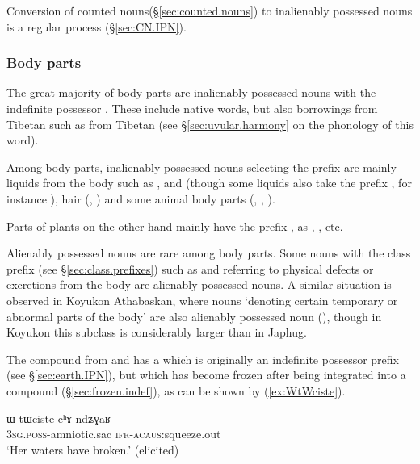 Conversion of counted nouns(§\ref{sec:counted.nouns}) to inalienably possessed nouns is a regular process (§\ref{sec:CN.IPN}).

\subsubsection{Body parts} \label{sec:body.part}
The great majority of body parts are inalienably possessed nouns with the indefinite possessor . These include native words, but also borrowings from Tibetan such as  from Tibetan  (see §\ref{sec:uvular.harmony} on the phonology of this word).

Among body parts, inalienably possessed nouns selecting the prefix  are mainly liquids from the body such as ,  and  (though some liquids also take the prefix , for instance ), hair (, ) and some animal body parts (, , ).

Parts of plants on the other hand mainly have the prefix , as , ,  etc.

Alienably possessed nouns are rare among body parts. Some nouns with the  class prefix (see §\ref{sec:class.prefixes}) such as  and  referring to physical defects or excretions from the body are alienably possessed nouns. A similar situation is observed in Koyukon Athabaskan, where nouns `denoting certain temporary or abnormal parts of the body' are also alienably possessed noun (\citealt[660]{thompson96koyukon}), though in Koyukon this subclass is considerably larger than in Japhug.

The compound  from  and  has a  which is originally an indefinite possessor prefix (see §\ref{sec:earth.IPN}), but which has become frozen after being integrated into a compound (§\ref{sec:frozen.indef}), as can be shown by (\ref{ex:WtWciste}). 

\begin{exe}
\ex \label{ex:WtWciste}
\gll ɯ-tɯciste cʰɤ-ndʑɣaʁ \\
\textsc{3sg}.\textsc{poss}-amniotic.sac \textsc{ifr}-\textsc{acaus}:squeeze.out \\
\glt `Her waters have broken.' (elicited)
\end{exe}


